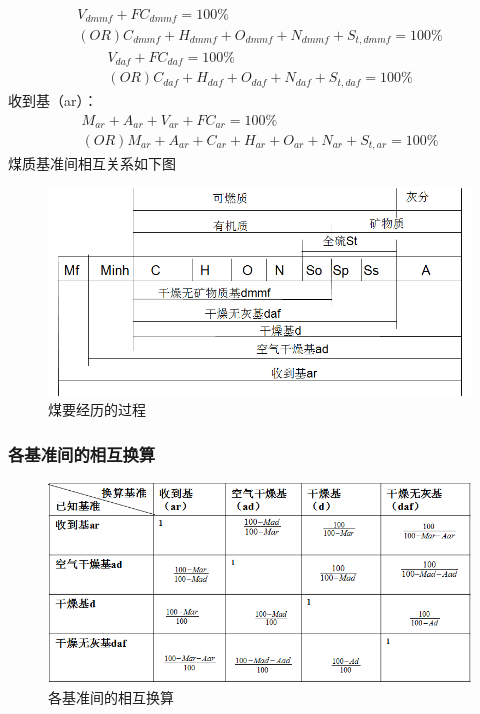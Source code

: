 \documentclass[10pt,openany]{ctexbook}
\begin{document}
\begin{eqnarray}
V_{dmmf}+FC_{dmmf}=100\% \\
(OR)C_{dmmf}+H_{dmmf}+O_{dmmf}+N_{dmmf}+S_{t,dmmf}=100\%
\end{eqnarray}
\begin{eqnarray}
V_{daf}+FC_{daf}=100\% \\
          (OR)C_{daf}+H_{daf}+O_{daf}+N_{daf}+S_{t,daf}=100\%
\end{eqnarray}
收到基（ar）：
\begin{eqnarray}
          M_{ar}+A_{ar}+V_{ar}+FC_{ar}=100\%\\
          (OR)M_{ar}+A_{ar}+C_{ar}+H_{ar}+O_{ar}+N_{ar}+S_{t,ar}=100\%
\end{eqnarray}
煤质基准间相互关系如下图
\begin{figure}[h]
\includegraphics[scale=0.6]{3}
\caption{煤要经历的过程}

\end{figure}
\subsubsection{各基准间的相互换算}
\begin{figure}[h]
\includegraphics[scale=0.7]{4}
\caption{各基准间的相互换算}

\end{figure}
\end{document}

